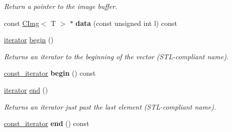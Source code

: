 \begin{DoxyCompactItemize}
\begin{DoxyCompactList}\small\item\em Return a pointer to the image buffer. \item\end{DoxyCompactList}\item 
\hypertarget{structcimg__library_1_1CImgList_ac4ee8d561578bcfa0b6512babf3a8697}{
const \hyperlink{structcimg__library_1_1CImg}{CImg}$<$ T $>$ $\ast$ {\bfseries data} (const unsigned int l) const }
\label{structcimg__library_1_1CImgList_ac4ee8d561578bcfa0b6512babf3a8697}

\item 
\hypertarget{structcimg__library_1_1CImgList_ad69bd11391be1a1dba5c8202259664f8}{
\hyperlink{structcimg__library_1_1CImg}{iterator} \hyperlink{structcimg__library_1_1CImgList_ad69bd11391be1a1dba5c8202259664f8}{begin} ()}
\label{structcimg__library_1_1CImgList_ad69bd11391be1a1dba5c8202259664f8}

\begin{DoxyCompactList}\small\item\em Returns an iterator to the beginning of the vector (STL-\/compliant name). \item\end{DoxyCompactList}\item 
\hypertarget{structcimg__library_1_1CImgList_aa4b02d4f1a8500fb07a551069060709f}{
\hyperlink{structcimg__library_1_1CImg}{const\_\-iterator} {\bfseries begin} () const }
\label{structcimg__library_1_1CImgList_aa4b02d4f1a8500fb07a551069060709f}

\item 
\hypertarget{structcimg__library_1_1CImgList_acad38d52497a975bfb6f2f6acd76631f}{
\hyperlink{structcimg__library_1_1CImg}{iterator} \hyperlink{structcimg__library_1_1CImgList_acad38d52497a975bfb6f2f6acd76631f}{end} ()}
\label{structcimg__library_1_1CImgList_acad38d52497a975bfb6f2f6acd76631f}

\begin{DoxyCompactList}\small\item\em Returns an iterator just past the last element (STL-\/compliant name). \item\end{DoxyCompactList}\item 
\hypertarget{structcimg__library_1_1CImgList_a350132543d80a1c1e5be844e6d2878ea}{
\hyperlink{structcimg__library_1_1CImg}{const\_\-iterator} {\bfseries end} () const }
\label{structcimg__library_1_1CImgList_a350132543d80a1c1e5be844e6d2878ea}


\end{DoxyCompactItemize}
